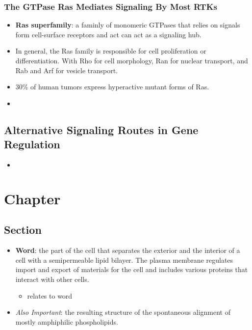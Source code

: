 \documentclass[12pt,a4paper]{article}
\begin{document}
\subsubsection{The GTPase Ras Mediates Signaling By Most RTKs}
\begin{itemize}
    \item \textbf{Ras superfamily}: a faminly of monomeric GTPases that relies on signals form cell-surface receptors and act can act as a signaling hub.
    \item In general, the Ras family is responsible for cell proliferation or differentiation. With Rho for cell morphology, Ran for nuclear transport, and Rab and Arf for vesicle transport.
    \item 30\% of human tumors express hyperactive mutant forms of Ras.
    \item 
\end{itemize}
\subsection{Alternative Signaling Routes in Gene Regulation}
\begin{itemize}
    \item 
\end{itemize}

\clearpage
\section{Chapter}
\subsection{Section}
\begin{itemize}
    \item \textbf{Word}: the part of the cell that separates the exterior and the interior of a cell with a semipermeable lipid bilayer. The plasma membrane regulates import and export of materials for the cell and includes various proteins that interact with other cells. 
    \begin{itemize}
        \item relates to word
    \end{itemize}
    \item \textit{Also Important}: the resulting structure of the spontaneous alignment of mostly amphiphilic phospholipids. 
\end{itemize}
\end{document}
